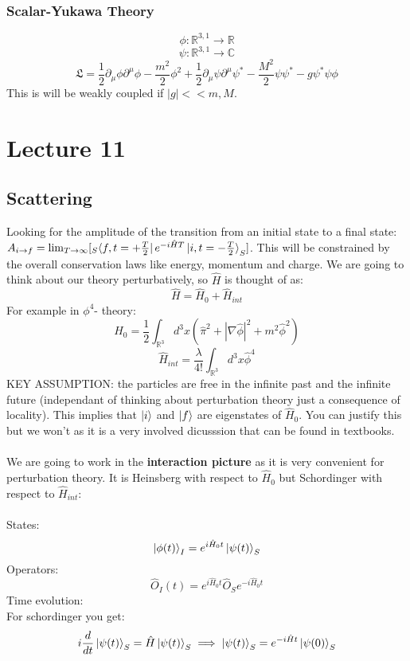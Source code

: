 \documentclass[12pt, a4paper, twoside, titlepage]{article}
\begin{document}
\subsubsection{Scalar-Yukawa Theory}
$$
\phi : \mathbb{R}^{3,1} \rightarrow \mathbb{R}
$$
$$
\psi: \mathbb{R}^{3,1} \rightarrow \mathbb{C}
$$
$$
\mathfrak{L} = \frac{1}{2} \partial_{\mu} \phi \partial^{\mu} \phi - \frac{m^2}{2} \phi^2 + \frac{1}{2} \partial_{\mu} \psi \partial^{\mu} \psi^* - \frac{M^2}{2} \psi \psi^* - g \psi^* \psi \phi 
$$
This is will be weakly coupled if $|g| << m, M$.
\section{Lecture 11}
\subsection{Scattering}
Looking for the amplitude of the transition from an initial state to a final state:
$A_{i \rightarrow f} = \lim_{T\rightarrow \infty} [_S\bra{f, t= +\frac{T}{2}}e^{-i\hat H T}\ket{i, t= -\frac{T}{2}}_S]$. This will be constrained by the overall conservation laws like energy, momentum and charge. We are going to think about our theory perturbatively, so $\hat H$ is thought of as:
$$
\hat H = \hat H_0 + \hat H_{int}
$$
For example in $\phi^4$- theory:
$$
\hat H_0 = \frac{1}{2}\int_{\mathbb{R}^3} d^3x (\hat \pi^2 + |\nabla \hat \phi|^2 + m^2 \hat \phi^2)
$$
$$
\hat H_{int} = \frac{\lambda}{4!} \int_{\mathbb{R}^3} d^3x \hat \phi^4
$$
KEY ASSUMPTION: the particles are free in the infinite past and the infinite future (independant of thinking about perturbation theory just a consequence of locality). This implies that $\ket{i}$ and $\ket{f}$ are eigenstates of $\hat H_0$. You can justify this but we won't as it is a very involved dicusssion that can be found in textbooks.\\\\
We are going to work in the \textbf{interaction picture} as it is very convenient for perturbation theory. It is Heinsberg with respect to $\hat H_0$ but Schordinger with respect to $\hat H_{int}$:\\\\
States:
$$
\ket{\phi(t)}_{I} = e^{i\hat H_0 t} \ket{\psi(t)}_S
$$
Operators:
$$
\hat O_I(t) = e^{i\hat H_0 t} \hat O_S e^{-i \hat H_0 t}
$$
Time evolution:\\
For schordinger you get:
$$
i \frac{d}{dt}\ket{\psi(t)}_S = \hat H \ket{\psi(t)}_S \implies \ket{\psi(t)}_S = e^{-i\hat H t} \ket{\psi(0)}_S
$$
\end{document}
